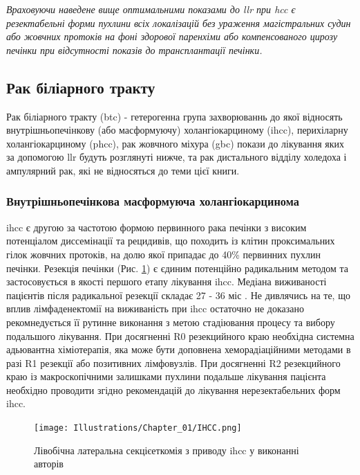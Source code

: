 \begin{refsection}
\emph{Враховуючи наведене вище оптимальними показами до \acrshort{llr} при \acrshort{hcc} є резектабельні форми пухлини всіх локалізацій без ураження магістральних судин або жовчних протоків на фоні здорової паренхіми або компенсованого цирозу печінки при відсутності показів до трансплантації печінки.}

\subsection{Рак біліарного тракту}

Рак біліарного тракту (\acrshort{btc}) - гетерогенна група захворюваннь до якої відносять внутрішньопечінкову (або масформуючу) холангіокарциному (\acrshort{ihcc}), перихіларну холангіокарциному (\acrshort{phcc}), рак жовчного міхура (\acrshort{gbc}) покази до лікування яких за допомогою \acrshort{llr} будуть розглянуті нижче, та рак дистального відділу холедоха і ампулярний рак, які не відносяться до теми цієї книги. 

\subsubsection{Внутрішньопечінкова масформуюча холангіокарцинома}

\acrshort{ihcc} є другою за частотою формою первинного рака печінки з високим потенціалом диссемінації та рецидивів, що походить із клітин проксимальних гілок жовчних протоків, на долю якої припадає до 40\% первинних пухлин печінки. Резекція печінки (Рис. \ref{fig:IHCC}) є єдиним потенційно радикальним методом та застосовується в якості першого етапу лікування \acrshort{ihcc}. Медіана виживаності пацієнтів після радикальної резекції складає 27 - 36 міс \cite{Buettner2017}. Не дивлячись на те, що вплив лімфаденектомії на виживаність при \acrshort{ihcc} остаточно не доказано рекомнедується її рутинне виконання з метою стадіювання процесу та вибору подальшого лікування. При досягненні R0 резекцийного краю необхідна системна адьювантна хіміотерапія, яка може бути доповнена хеморадіаційними методами в разі R1 резекції або позитивних лімфовузлів. При досягненні R2 резекцийного краю із макроскопічними залишками пухлини подальше лікування пацієнта необхідно проводити згідно рекомендацій до лікування нерезектабельних форм \acrshort{ihcc}. 


\begin{figure}[h]
\caption{Лівобічна латеральна секцієеткомія з приводу \acrshort{ihcc} у виконанні авторів}


\texttt{[image: Illustrations/Chapter\_01/IHCC.png]}
\label{fig:IHCC}


\end{figure}
\end{refsection}
